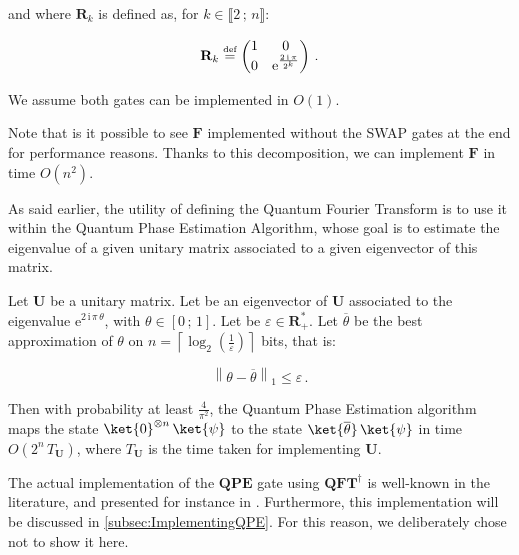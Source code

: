 \documentclass[11pt, a4paper]{article}
\begin{document}
\begin{definition}
                    and where \(\mathbf{R}_k\) is defined as, for \(k\in\llbracket2\,;\,n\rrbracket\):
                    
                    \[\mathbf{R}_k\overset{\text{\tiny{def}}}{=}\begin{pmatrix}1 & 0\\0 & \mathrm{e}^{\frac{2\,\mathrm{i}\,\pi}{2^k}}\end{pmatrix}\,.\]
                    
                    We assume both gates can be implemented in \(O(1)\).
                    
                    Note that is it possible to see \(\mathbf{F}\) implemented without the SWAP gates at the end for performance reasons. Thanks to this decomposition, we can implement \(\mathbf{F}\) in time \(O\left(n^2\right)\).
                \end{definition}
                
                As said earlier, the utility of defining the Quantum Fourier Transform is to use it within the Quantum Phase Estimation Algorithm, whose goal is to estimate the eigenvalue of a given unitary matrix associated to a given eigenvector of this matrix.
                
                \begin{definition}
                    Let \(\mathbf{U}\) be a unitary matrix. Let \ket{\psi} be an eigenvector of \(\mathbf{U}\) associated to the eigenvalue \(\mathrm{e}^{2\,\mathrm{i}\,\pi\,\theta}\), with \(\theta\in[0\,;\,1]\). Let be \(\varepsilon\in\mathbf{R}_+^*\). Let \(\overline{\theta}\) be the best approximation of \(\theta\) on \(n=\left\lceil\log_2(\frac1\varepsilon)\right\rceil\) bits, that is:
                    
                    \[\left\|\theta-\overline{\theta}\right\|_1\leqslant\varepsilon\,.\]
                    
                    Then with probability at least \(\frac{4}{\pi^2}\), the Quantum Phase Estimation algorithm maps the state \(\ket{0}^{\otimes n}\,\ket{\psi}\) to the state \(\ket{\overline{\theta}}\,\ket{\psi}\) in time \(O\left(2^n\,T_\mathbf{U}\right)\), where \(T_{\mathbf{U}}\) is the time taken for implementing \(\mathbf{U}\).
                    
                    The actual implementation of the \(\mathbf{QPE}\) gate using \(\mathbf{QFT}^\dagger\) is well-known in the literature, and presented for instance in \cite{QPE}. Furthermore, this implementation will be discussed in \autoref{subsec:ImplementingQPE}. For this reason, we deliberately chose not to show it here.
                \end{definition}
\end{document}
